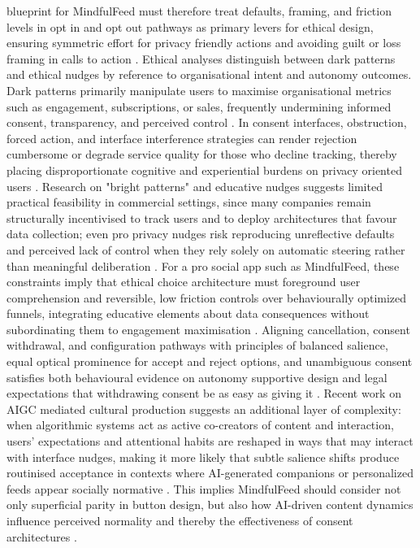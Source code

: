 \documentclass{article}
\begin{document}
blueprint for MindfulFeed must therefore treat defaults, framing, and friction levels in opt in and opt out pathways as primary levers for ethical design, ensuring symmetric effort for privacy friendly actions and avoiding guilt or loss framing in calls to action \parencites[8]{4807303}[12]{5678011}. Ethical analyses distinguish between dark patterns and ethical nudges by reference to organisational intent and autonomy outcomes. Dark patterns primarily manipulate users to maximise organisational metrics such as engagement, subscriptions, or sales, frequently undermining informed consent, transparency, and perceived control \parencites[2]{2668071}[2]{4807303}. In consent interfaces, obstruction, forced action, and interface interference strategies can render rejection cumbersome or degrade service quality for those who decline tracking, thereby placing disproportionate cognitive and experiential burdens on privacy oriented users \parencites[3]{5678011}[12]{5678011}. Research on "bright patterns" and educative nudges suggests limited practical feasibility in commercial settings, since many companies remain structurally incentivised to track users and to deploy architectures that favour data collection; even pro privacy nudges risk reproducing unreflective defaults and perceived lack of control when they rely solely on automatic steering rather than meaningful deliberation \parencites[15]{5678011}. For a pro social app such as MindfulFeed, these constraints imply that ethical choice architecture must foreground user comprehension and reversible, low friction controls over behaviourally optimized funnels, integrating educative elements about data consequences without subordinating them to engagement maximisation \parencites[15]{5678011}[3]{5678011}. Aligning cancellation, consent withdrawal, and configuration pathways with principles of balanced salience, equal optical prominence for accept and reject options, and unambiguous consent satisfies both behavioural evidence on autonomy supportive design and legal expectations that withdrawing consent be as easy as giving it \parencites[12]{5678011}[3]{5678011}[2]{4807303}. Recent work on AIGC mediated cultural production suggests an additional layer of complexity: when algorithmic systems act as active co-creators of content and interaction, users' expectations and attentional habits are reshaped in ways that may interact with interface nudges, making it more likely that subtle salience shifts produce routinised acceptance in contexts where AI-generated companions or personalized feeds appear socially normative \parencites[4]{6567535}. This implies MindfulFeed should consider not only superficial parity in button design, but also how AI-driven content dynamics influence perceived normality and thereby the effectiveness of consent architectures \parencites{6567535}.
\end{document}
